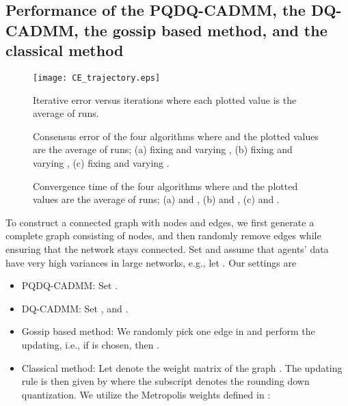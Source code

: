 \documentclass[journal]{IEEEtran}
\begin{document}
\subsection{Performance of the PQDQ-CADMM, the DQ-CADMM, the gossip based method, and the classical method}
\begin{figure}[htbp]
	\centering
	\texttt{[image: CE\_trajectory.eps]}\caption{Iterative error versus iterations where each plotted value is the average of  runs.}
	\label{fig:CEtra}
\end{figure}
  
 \begin{figure*}[ht]
	\centering
	\caption{Consensus error of the four algorithms where  and the plotted values are the average of  runs; (a) fixing  and varying , (b) fixing  and varying , (c) fixing  and varying .}
	\label{fig:cerr}
\end{figure*}
\begin{figure*}[ht]
	\centering
	\caption{Convergence time of the four algorithms where  and the plotted values are the average of  runs; (a)  and , (b)  and , (c)  and .}
	\label{fig:ctime}
\end{figure*}
To construct a connected graph with  nodes and  edges, we first generate a complete graph consisting of  nodes, and then randomly remove  edges while ensuring that the network stays connected. Set  and assume that agents' data have very high variances in large networks, e.g., let . Our settings are\begin{itemize}
\item PQDQ-CADMM: Set .
\item DQ-CADMM: Set ,  and .
\item Gossip based method: We randomly pick one edge in  and perform the updating, i.e., if  is chosen, then . 
\item Classical method: Let  denote the weight matrix of the graph . The updating rule is then given by  where the subscript  denotes the rounding down quantization. We utilize the Metropolis weights defined in \cite{Xiao2005}: 

\end{itemize}
\end{document}
